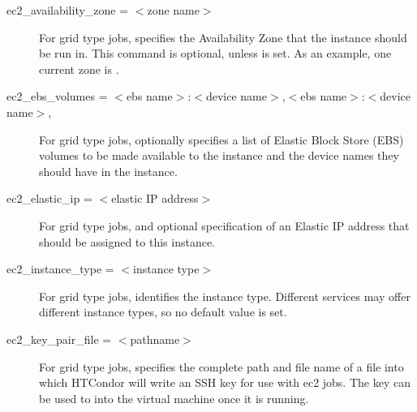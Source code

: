 \begin{description}

\label{condor-submit-ec2-availability-zone}
\item[ec2\_availability\_zone = $<$zone name$>$]
For grid type  jobs, 
specifies the Availability Zone that the instance should be run in. 
This command is optional, unless  is set.
As an example, one current zone is .


\label{condor-submit-ec2-ebs-volumes}
\item[ec2\_ebs\_volumes = $<$ebs name$>$:$<$device name$>$,$<$ebs name$>$:$<$device name$>$,\Dots]
For grid type  jobs,
optionally specifies a list of Elastic Block Store (EBS)
volumes to be made available to the instance and the device names they
should have in the instance.


\label{condor-submit-ec2-elastic-id}
\item[ec2\_elastic\_ip = $<$elastic IP address$>$]
For grid type  jobs,
and optional specification of an Elastic IP address 
that should be assigned to this instance.


\label{condor-submit-ec2-instance-type}
\item[ec2\_instance\_type = $<$instance type$>$]
For grid type  jobs, identifies the instance type.
Different services may offer different instance types,
so no default value is set.


\item[ec2\_key\_pair\_file = $<$pathname$>$]
For grid type  jobs, 
specifies the complete path and file name of a file into which 
HTCondor will write an SSH key for use with ec2 jobs. 
The key can be used to  into the
virtual machine once it is running.



\end{description}
